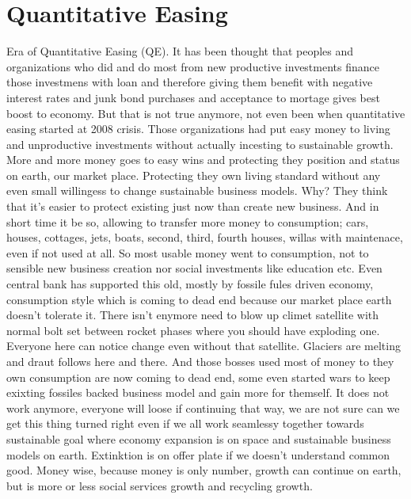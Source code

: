\section{Quantitative Easing}
Era of Quantitative Easing (QE). It has been thought that peoples and organizations who did and do most from new productive investments finance those investmens with loan and therefore giving them benefit with negative interest rates and junk bond purchases and acceptance to mortage gives best boost to economy. But that is not true anymore, not even been when quantitative easing started at 2008 crisis. Those organizations had put easy money to living and unproductive investments without actually incesting to sustainable growth. More and more money goes to easy wins and protecting they position and status on earth, our market place. Protecting they own living standard without any even small willingess to change sustainable business models. Why? They think that it's easier to protect existing just now than create new business. And in short time it be so, allowing to transfer more money to consumption; cars, houses, cottages, jets, boats, second, third, fourth houses, willas with maintenace, even if not used at all. So most usable money went to consumption, not to sensible new business creation nor social investments like education etc. Even central bank has supported this old, mostly by fossile fules driven economy, consumption style which is coming to dead end because our market place earth doesn't tolerate it. There isn't enymore need to blow up climet satellite with normal bolt set between rocket phases where you should have exploding one. Everyone here can notice change even without that satellite. Glaciers are melting and draut follows here and there. And those bosses used most of money to they own consumption are now coming to dead end, some even started wars to keep exixting fossiles backed business model and gain more for themself. It does not work anymore, everyone will loose if continuing that way, we are not sure can we get this thing turned right even if we all work seamlessy together towards sustainable goal where economy expansion is on space and sustainable business models on earth. Extinktion is on offer plate if we doesn't understand common good. Money wise, because money is only number, growth can continue on earth, but is more or less social services growth and recycling growth.

